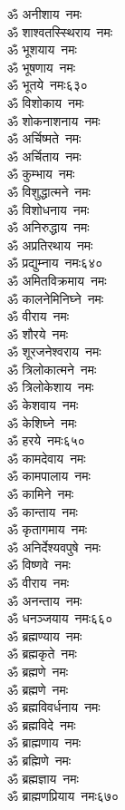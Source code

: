 \begin{multicols}{2}
\begin{flushleft}
ॐ अनीशाय~नमः\\
ॐ शाश्वतस्स्थिराय~नमः\\
ॐ भूशयाय~नमः\\
ॐ भूषणाय~नमः\\
ॐ भूतये~नमः\hfill ६३०\\
ॐ विशोकाय~नमः\\
ॐ शोकनाशनाय~नमः\\
ॐ अर्चिष्मते~नमः\\
ॐ अर्चिताय~नमः\\
ॐ कुम्भाय~नमः\\
ॐ विशुद्धात्मने~नमः\\
ॐ विशोधनाय~नमः\\
ॐ अनिरुद्धाय~नमः\\
ॐ अप्रतिरथाय~नमः\\
ॐ प्रद्युम्नाय~नमः\hfill ६४०\\
ॐ अमितविक्रमाय~नमः\\
ॐ कालनेमिनिघ्ने~नमः\\
ॐ वीराय~नमः\\
ॐ शौरये~नमः\\
ॐ शूरजनेश्वराय~नमः\\
ॐ त्रिलोकात्मने~नमः\\
ॐ त्रिलोकेशाय~नमः\\
ॐ केशवाय~नमः\\
ॐ केशिघ्ने~नमः\\
ॐ हरये~नमः\hfill ६५०\\
ॐ कामदेवाय~नमः\\
ॐ कामपालाय~नमः\\
ॐ कामिने~नमः\\
ॐ कान्ताय~नमः\\
ॐ कृतागमाय~नमः\\
ॐ अनिर्देश्यवपुषे~नमः\\
ॐ विष्णवे~नमः\\
ॐ वीराय~नमः\\
ॐ अनन्ताय~नमः\\
ॐ धनञ्जयाय~नमः\hfill ६६०\\
ॐ ब्रह्मण्याय~नमः\\
ॐ ब्रह्मकृते~नमः\\
ॐ ब्रह्मणे~नमः\\
ॐ ब्रह्मणे~नमः\\
ॐ ब्रह्मविवर्धनाय~नमः\\
ॐ ब्रह्मविदे~नमः\\
ॐ ब्राह्मणाय~नमः\\
ॐ ब्रह्मिणे~नमः\\
ॐ ब्रह्मज्ञाय~नमः\\
ॐ ब्राह्मणप्रियाय~नमः\hfill ६७०\\

\end{flushleft}
\end{multicols}
